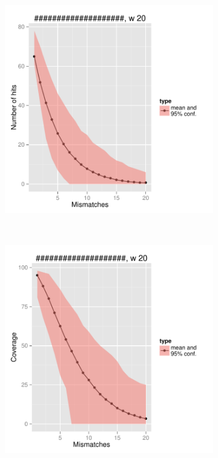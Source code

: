 \begin{figure}
	\centering

	\begin{subfigure}[b]{0.47\textwidth}
		\includegraphics[width=\textwidth]{images/3.3/Myco-w20-cont-hit-confidence.pdf}
		\label{weight-20-cont-hit-confidence}
	\end{subfigure}
	~	
	\begin{subfigure}[b]{0.47\textwidth}
		\includegraphics[width=\textwidth]{images/3.3/Myco-w20-cont-cover-confidence.pdf}
		\label{weight-20-cont-cover-confidence}
	\end{subfigure}\\
              

\end{figure}

